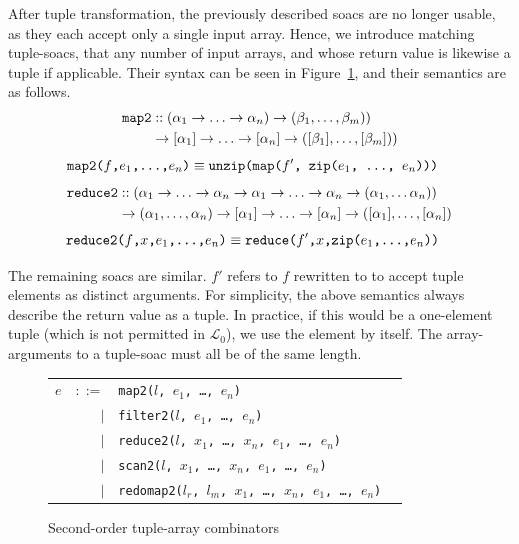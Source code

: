 \documentclass{sigplanconf}  %
\newcommand{\LO}{$\mathcal{L}_0$}
\begin{document}
After tuple transformation, the previously described {\sc soac}s are
no longer usable, as they each accept only a single input array.
Hence, we introduce matching tuple-{\sc soac}s, that any number of
input arrays, and whose return value is likewise a tuple if
applicable.  Their syntax can be seen in
Figure~\ref{fig:tuple-soacs}, and their semantics are as follows.
\begin{align*}
  \text{\tt map2} &:: (\alpha_{1}\rightarrow\ldots\rightarrow\alpha_{n})\rightarrow(\beta_{1},\ldots,\beta_{m}))\\
&\rightarrow[\alpha_{1}]\rightarrow\ldots\rightarrow[\alpha_{n}]\rightarrow([\beta_{1}],\ldots,[\beta_{m}]))
\end{align*}
\begin{align*}
  \text{\tt map2($f$,$e_{1}$,\ldots,$e_{n}$)} & \equiv \text{\tt unzip(map($f'$, zip($e_{1}$, \ldots, $e_{n}$)))}
\end{align*}
\begin{align*}
  \text{\tt reduce2} &::(\alpha_{1}\rightarrow\ldots\rightarrow\alpha_{n}\rightarrow\alpha_{1}\rightarrow\ldots\rightarrow\alpha_{n}\rightarrow(\alpha_{1},\ldots\alpha_{n}))\\
& \rightarrow(\alpha_{1},\ldots,\alpha_{n})\rightarrow[\alpha_{1}]\rightarrow\ldots\rightarrow[\alpha_{n}]\rightarrow([\alpha_{1}],\ldots,[\alpha_{n}])
\end{align*}
\begin{align*}
  \text{\tt reduce2($f$,$x$,$e_{1}$,\ldots,$e_{n}$)} &\equiv \text{\tt reduce($f'$,$x$,zip($e_{1}$,\ldots,$e_{n}$))}
\end{align*}

The remaining {\sc soac}s are similar.  $f'$ refers to $f$ rewritten to to
accept tuple elements as distinct arguments.  For simplicity, the
above semantics always describe the return value as a tuple.  In
practice, if this would be a one-element tuple (which is not permitted
in \LO), we use the element by itself.  The array-arguments to a
tuple-{\sc soac} must all be of the same length.

\begin{figure}[bt]
\begin{tabular}{lrll}
$e$ & $::=$ & {\tt map2($l$, $e_{1}$, \ldots, $e_{n}$)} \\
    & $|$ & {\tt filter2($l$, $e_{1}$, \ldots, $e_{n}$)} \\
    & $|$ & {\tt reduce2($l$, $x_{1}$, \ldots, $x_{n}$, $e_{1}$, \ldots, $e_{n}$)} \\
    & $|$ & {\tt scan2($l$, $x_{1}$, \ldots, $x_{n}$, $e_{1}$, \ldots, $e_{n}$)} \\
    & $|$ & {\tt redomap2($l_{r}$, $l_{m}$, $x_{1}$, \ldots, $x_{n}$, $e_{1}$, \ldots, $e_{n}$)} \\
\end{tabular}
\caption{Second-order tuple-array combinators}
\label{fig:tuple-soacs}
\end{figure}
\end{document}
